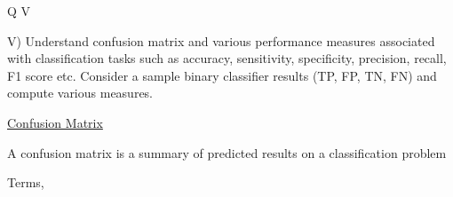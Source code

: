 \documentclass[12pt]{article}
\renewcommand{\_}{\kern-1.5pt\textunderscore\kern-1.5pt}
\begin{document}
\vspace{\baselineskip}

\vspace{\baselineskip}

\vspace{\baselineskip}

\vspace{\baselineskip}

\vspace{\baselineskip}

\vspace{\baselineskip}

\vspace{\baselineskip}

\vspace{\baselineskip}

\vspace{\baselineskip}

\vspace{\baselineskip}

\vspace{\baselineskip}

\vspace{\baselineskip}
\begin{Center}
{\fontsize{28pt}{33.6pt}\selectfont Q V\par}
\end{Center}\par

{\fontsize{14pt}{16.8pt}\selectfont V) Understand confusion matrix and various performance measures associated with classification tasks such as accuracy, sensitivity, specificity, precision, recall, F1 score etc. Consider a sample binary classifier results (TP, FP, TN, FN) and compute various measures.\par}\par

{\fontsize{14pt}{16.8pt}\selectfont \uline{Confusion Matrix}\par}\par

A confusion matrix is a summary of predicted results on a classification problem \par

Terms,\par
\end{document}
